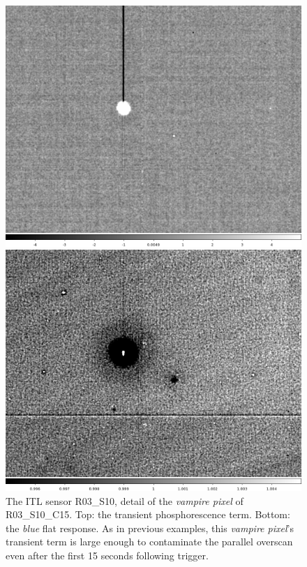 \begin{figure}[!htbp]
\centering
\begin{minipage}{1.0\textwidth}    
  \centering
  \includegraphics[width=.6\linewidth]{sections/figures/phosphorescence-survey/stains_phos_R03_S10.png}    
\end{minipage}
\begin{minipage}{1.0\textwidth}
  \centering
  \includegraphics[width=.6\linewidth]{sections/figures/phosphorescence-survey/stains_abs_R03_S10.png}
\end{minipage}
\caption{The ITL sensor R03\_S10, detail of the {\it vampire pixel} of R03\_S10\_C15. Top: the transient phosphorescence term. Bottom: the {\it blue} flat response. As in previous examples, this {\it vampire pixel}'s transient term is large enough to contaminate the parallel overscan even after the first 15 seconds following trigger.}
\label{fig:phos:stains:R03S10}
\end{figure}


